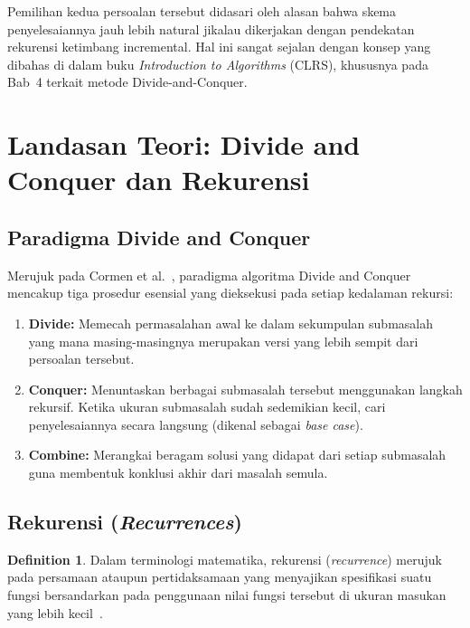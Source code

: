 \documentclass[12pt,a4paper]{article}
\theoremstyle{definition}
\newtheorem{definition}{Definition}[section]
\begin{document}
Pemilihan kedua persoalan tersebut didasari oleh alasan bahwa skema penyelesaiannya
jauh lebih natural jikalau dikerjakan dengan pendekatan rekurensi ketimbang 
incremental. Hal ini sangat sejalan dengan konsep yang dibahas di dalam buku 
\emph{Introduction to Algorithms} (CLRS), khususnya pada Bab~4 terkait metode 
Divide-and-Conquer.

\section{Landasan Teori: Divide and Conquer dan Rekurensi}

\subsection{Paradigma Divide and Conquer}

Merujuk pada Cormen et al.~\cite{clrs}, paradigma algoritma Divide and Conquer 
mencakup tiga prosedur esensial yang dieksekusi pada setiap kedalaman rekursi:

\begin{enumerate}
  \item \textbf{Divide:} Memecah permasalahan awal ke dalam sekumpulan submasalah 
        yang mana masing-masingnya merupakan versi yang lebih sempit dari persoalan tersebut.
  \item \textbf{Conquer:} Menuntaskan berbagai submasalah tersebut menggunakan langkah 
        rekursif. Ketika ukuran submasalah sudah sedemikian kecil, cari penyelesaiannya 
        secara langsung (dikenal sebagai \emph{base case}).
  \item \textbf{Combine:} Merangkai beragam solusi yang didapat dari setiap submasalah 
        guna membentuk konklusi akhir dari masalah semula.
\end{enumerate}

\subsection{Rekurensi (\textit{Recurrences})}

\begin{definition}
  Dalam terminologi matematika, rekurensi (\emph{recurrence}) merujuk pada persamaan 
  ataupun pertidaksamaan yang menyajikan spesifikasi suatu fungsi bersandarkan pada 
  penggunaan nilai fungsi tersebut di ukuran masukan yang lebih kecil~\cite{clrs}.
\end{definition}
\end{document}
